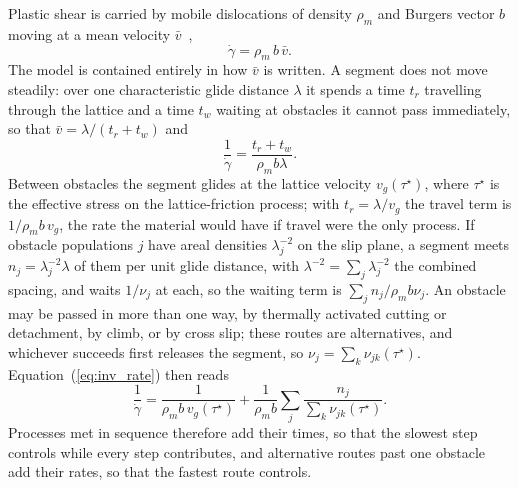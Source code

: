 \documentclass[aps,prl,twocolumn,superscriptaddress,amsmath,amssymb,floatfix]{revtex4-2}
\newcommand{\gd}{\dot\gamma}
\newcommand{\ts}{\tau^{\star}}
\begin{document}
Plastic shear is carried by mobile dislocations of density $\rho_m$ and Burgers vector $b$ moving at a mean velocity $\bar v$~\cite{Orowan1940},
\begin{equation}
\gd=\rho_m\,b\,\bar v .
\label{eq:orowan}
\end{equation}
The model is contained entirely in how $\bar v$ is written. A segment does not move steadily: over one characteristic glide distance $\lambda$ it spends a time $t_r$ travelling through the lattice and a time $t_w$ waiting at obstacles it cannot pass immediately, so that $\bar v=\lambda/(t_r+t_w)$ and
\begin{equation}
\frac{1}{\gd}=\frac{t_r+t_w}{\rho_mb\lambda}.
\label{eq:inv_rate}
\end{equation}
Between obstacles the segment glides at the lattice velocity $v_g(\ts)$, where $\ts$ is the effective stress on the lattice-friction process; with $t_r=\lambda/v_g$ the travel term is $1/\rho_mb\,v_g$, the rate the material would have if travel were the only process. If obstacle populations $j$ have areal densities $\lambda_j^{-2}$ on the slip plane, a segment meets $n_j=\lambda_j^{-2}\lambda$ of them per unit glide distance, with $\lambda^{-2}=\sum_j\lambda_j^{-2}$ the combined spacing, and waits $1/\nu_j$ at each, so the waiting term is $\sum_jn_j/\rho_mb\nu_j$. An obstacle may be passed in more than one way, by thermally activated cutting or detachment, by climb, or by cross slip; these routes are alternatives, and whichever succeeds first releases the segment, so $\nu_j=\sum_k\nu_{jk}(\ts)$. Equation~(\ref{eq:inv_rate}) then reads
\begin{equation}
\frac{1}{\gd}=\frac{1}{\rho_mb\,v_g(\ts)}+\frac{1}{\rho_mb}\sum_j\frac{n_j}{\sum_k\nu_{jk}(\ts)} .
\label{eq:general}
\end{equation}
Processes met in sequence therefore add their times, so that the slowest step controls while every step contributes, and alternative routes past one obstacle add their rates, so that the fastest route controls.
\end{document}
